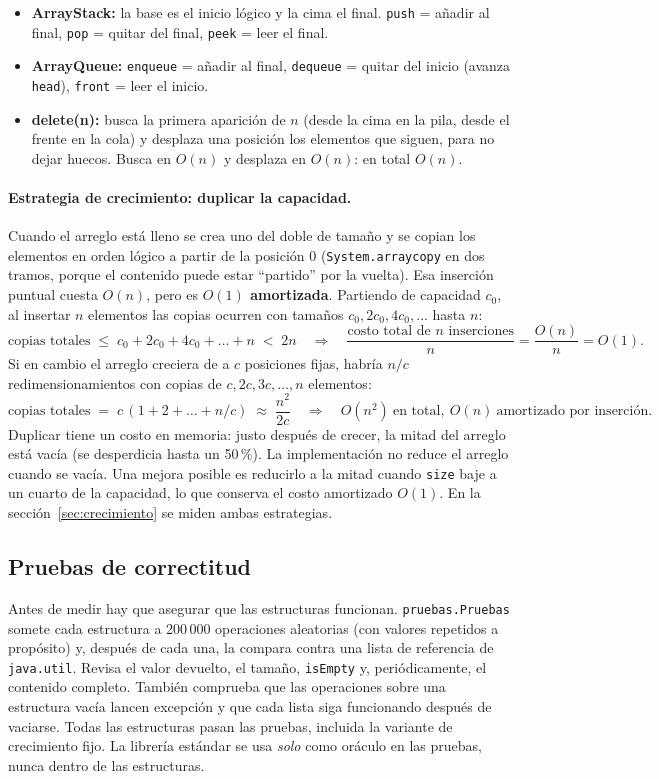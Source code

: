 \documentclass[11pt,a4paper]{article}
\newcommand{\Oone}{$O(1)$}
\newcommand{\On}{$O(n)$}
\begin{document}
\begin{itemize}
\item \textbf{ArrayStack:} la base es el inicio lógico y la cima el final. \texttt{push} = añadir al
  final, \texttt{pop} = quitar del final, \texttt{peek} = leer el final.
\item \textbf{ArrayQueue:} \texttt{enqueue} = añadir al final, \texttt{dequeue} = quitar del inicio
  (avanza \texttt{head}), \texttt{front} = leer el inicio.
\item \textbf{delete(n):} busca la primera aparición de $n$ (desde la cima en la pila, desde el frente
  en la cola) y desplaza una posición los elementos que siguen, para no dejar huecos. Busca en \On{} y
  desplaza en \On: en total \On.
\end{itemize}

\paragraph{Estrategia de crecimiento: duplicar la capacidad.} Cuando el arreglo está lleno se crea uno
del doble de tamaño y se copian los elementos en orden lógico a partir de la posición 0
(\texttt{System.arraycopy} en dos tramos, porque el contenido puede estar ``partido'' por la vuelta).
Esa inserción puntual cuesta \On, pero es \textbf{\Oone{} amortizada}. Partiendo de capacidad $c_0$,
al insertar $n$ elementos las copias ocurren con tamaños $c_0, 2c_0, 4c_0, \dots$ hasta $n$:
\[
\text{copias totales} \;\le\; c_0 + 2c_0 + 4c_0 + \dots + n \;<\; 2n
\quad\Longrightarrow\quad
\frac{\text{costo total de } n \text{ inserciones}}{n} = \frac{O(n)}{n} = O(1).
\]
Si en cambio el arreglo creciera de a $c$ posiciones fijas, habría $n/c$ redimensionamientos con copias
de $c, 2c, 3c, \dots, n$ elementos:
\[
\text{copias totales} \;=\; c\,(1+2+\dots+n/c) \;\approx\; \frac{n^2}{2c}
\quad\Longrightarrow\quad O(n^2)\ \text{en total},\ O(n)\ \text{amortizado por inserción.}
\]
Duplicar tiene un costo en memoria: justo después de crecer, la mitad del arreglo está vacía (se
desperdicia hasta un 50\,\%). La implementación no reduce el arreglo cuando se vacía. Una mejora
posible es reducirlo a la mitad cuando \texttt{size} baje a un cuarto de la capacidad, lo que conserva
el costo amortizado \Oone. En la sección~\ref{sec:crecimiento} se miden ambas estrategias.

\subsection{Pruebas de correctitud}\label{sec:pruebas}
Antes de medir hay que asegurar que las estructuras funcionan. \texttt{pruebas.Pruebas} somete cada
estructura a 200\,000 operaciones aleatorias (con valores repetidos a propósito) y, después de cada
una, la compara contra una lista de referencia de \texttt{java.util}. Revisa el valor devuelto, el
tamaño, \texttt{isEmpty} y, periódicamente, el contenido completo. También comprueba que las
operaciones sobre una estructura vacía lancen excepción y que cada lista siga funcionando después de
vaciarse. Todas las estructuras pasan las pruebas, incluida la variante de crecimiento fijo. La
librería estándar se usa \emph{solo} como oráculo en las pruebas, nunca dentro de las estructuras.
\end{document}
